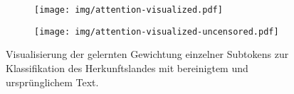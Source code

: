 \documentclass[bachelor,german]{info1thesis}
\begin{document}
\begin{figure}
     \centering
     \begin{subfigure}[b]{0.8\textwidth}
         \centering
         \texttt{[image: img/attention-visualized.pdf]}
         \label{fig:hist-mentions}
     \end{subfigure}
     \begin{subfigure}[b]{0.8\textwidth}
         \centering
         \vspace{.5em}
         \texttt{[image: img/attention-visualized-uncensored.pdf]}
         \label{fig:hist-clusters}
     \end{subfigure}
     \caption{Visualisierung der gelernten Gewichtung einzelner Subtokens zur Klassifikation des Herkunftslandes mit bereinigtem und ursprünglichem Text.}
     \label{fig:droc-histograms}
\end{figure}

\end{document}
